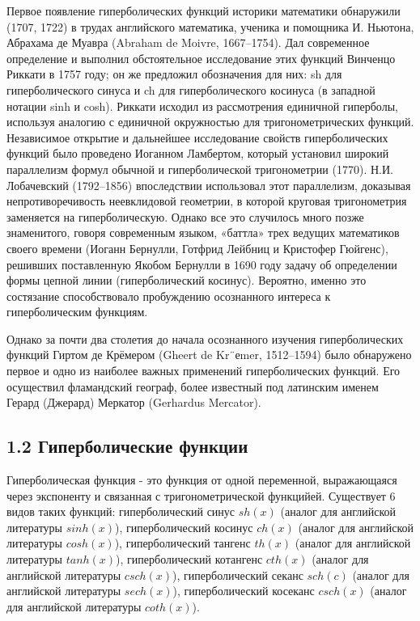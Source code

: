 Первое появление гиперболических функций историки математики обнаружили (1707, 1722) в
трудах английского математика, ученика и помощника И. Ньютона, Абрахама де Муавра (Abraham
de Moivre, 1667–1754). Дал современное определение и выполнил обстоятельное исследование этих функций Винченцо Риккати в 1757 году; он
же предложил обозначения для них: sh для гиперболического синуса и ch для гиперболического
косинуса (в западной нотации sinh и cosh). Риккати исходил из рассмотрения единичной гиперболы, используя аналогию с единичной окружностью для тригонометрических функций. Независимое
открытие и дальнейшее исследование свойств гиперболических функций было проведено Иоганном
Ламбертом, который установил широкий параллелизм формул обычной и гиперболической тригонометрии (1770). Н.И. Лобачевский (1792–1856) впоследствии использовал этот параллелизм, доказывая непротиворечивость неевклидовой геометрии, в которой круговая тригонометрия заменяется
на гиперболическую. Однако все это случилось много позже знаменитого, говоря современным языком, «баттла» трех ведущих математиков своего времени (Иоганн Бернулли, Готфрид Лейбниц и
Кристофер Гюйгенс), решивших поставленную Якобом Бернулли в 1690 году задачу об определении
формы цепной линии (гиперболический косинус). Вероятно, именно это состязание способствовало
пробуждению осознанного интереса к гиперболическим функциям.

Однако за почти два столетия до начала осознанного изучения гиперболических функций Гиртом
де Крёмером (Gheert de Kr¨еmer, 1512–1594) было обнаружено первое и одно из наиболее важных
применений гиперболических функций. Его осуществил фламандский географ, более известный под
латинским именем Герард (Джерард) Меркатор (Gerhardus Mercator).

\subsection*{1.2 Гиперболические функции}
Гиперболическая функция - это функция от одной переменной, выражающаяся через экспоненту и связанная с тригонометрической функцийей. Существует 6 видов таких функций: 
гиперболический синус $sh(x)$ (аналог для английской литературы $sinh(x)$), гиперболический косинус $ch(x)$ (аналог для английской литературы $cosh(x)$), 
гиперболический тангенс $th(x)$ (аналог для английской литературы $tanh(x)$), гиперболический котангенс $cth(x)$ (аналог для английской литературы $csch(x)$), 
гиперболический секанс $sch(c)$ (аналог для английской литературы $sech(x)$), гиперболический косеканс $csch(x)$ (аналог для английской литературы $coth(x)$).

